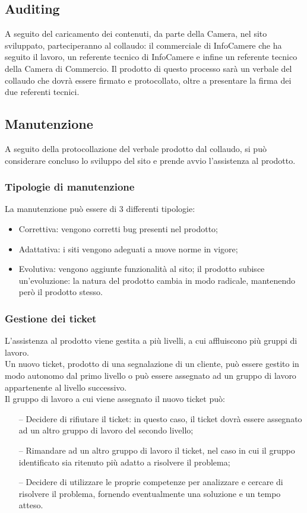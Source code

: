 	\subsection{Auditing}
	A seguito del caricamento dei contenuti, da parte della Camera, nel sito sviluppato, parteciperanno al collaudo: il commerciale di InfoCamere che ha seguito il lavoro, un referente tecnico di InfoCamere e infine un referente tecnico della Camera di Commercio. Il prodotto di questo processo sarà un verbale del collaudo che dovrà essere firmato e protocollato, oltre a presentare la firma dei due referenti tecnici.

	\subsection{Manutenzione}
	A seguito della protocollazione del verbale prodotto dal collaudo, si può considerare concluso lo sviluppo del sito e prende avvio l'assistenza al prodotto.
		\subsubsection{Tipologie di manutenzione}
			La manutenzione può essere di 3 differenti tipologie:
			\begin{itemize}
				\item{Correttiva: vengono corretti bug presenti nel prodotto;}
				\item{Adattativa: i siti vengono adeguati a nuove norme in vigore;}
				\item{Evolutiva: vengono aggiunte funzionalità al sito; il prodotto subisce un'evoluzione: la natura del prodotto cambia in modo radicale, mantenendo però il prodotto stesso.}
			\end{itemize}

		\subsubsection{Gestione dei ticket}
		L'assistenza al prodotto viene gestita a più livelli, a cui affluiscono più gruppi di lavoro. \\
		Un nuovo ticket, prodotto di una segnalazione di un cliente, può essere gestito in modo autonomo dal primo livello o può essere assegnato ad un gruppo di lavoro appartenente al livello successivo. \\
		Il gruppo di lavoro a cui viene assegnato il nuovo ticket può:
		\begin{itemize}
			\item[--] {Decidere di rifiutare il ticket: in questo caso, il ticket dovrà essere assegnato ad un altro gruppo di lavoro del secondo livello;}
			\item[--] {Rimandare ad un altro gruppo di lavoro il ticket, nel caso in cui il gruppo identificato sia ritenuto più adatto a risolvere il problema;}
			\item[--] {Decidere di utilizzare le proprie competenze per analizzare e cercare di risolvere il problema, fornendo eventualmente una soluzione e un tempo atteso.}
		\end{itemize}
	
